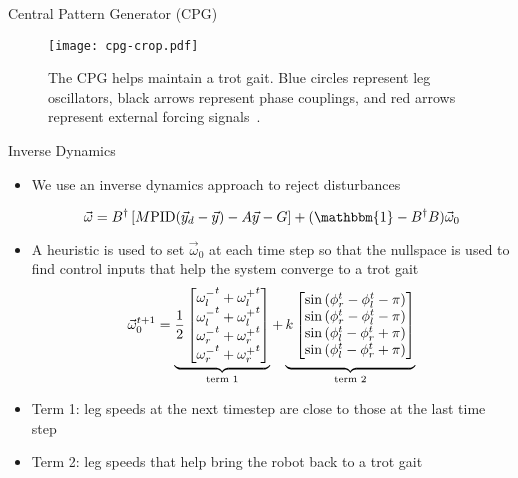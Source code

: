 \textcolor{prime}{\textsf{Central Pattern Generator (CPG)}} \\
\begin{figure}[h]
	\centering
    \texttt{[image: cpg-crop.pdf]}
    \caption{The CPG helps maintain a trot gait. Blue circles represent leg oscillators, black arrows represent phase couplings, and red arrows represent external forcing signals~\cite{crespi2006amphibot}.}
    \label{fig:CPG_Network}
\end{figure}
\vspace{-0.25in}

\vspace{1EX}
\textcolor{prime}{\textsf{Inverse Dynamics}} \\
\begin{itemize}
\item We use an inverse dynamics approach to reject disturbances

    \begin{equation}
        \vec{\omega} = B^{\dagger} \left[M \mathrm{PID}(\vec{y}_d - \vec{y})- A \vec{y} - G \right] + (\mathbbm{1} - B^{\dagger} B) \vec{\omega}_0 \label{eq:control}
    \end{equation}

\item A heuristic is used to set $\vec{\omega}_0$ at each time step so that the nullspace is used to find control inputs that help the system converge to a trot gait
\begin{equation}
    \vec{\omega}_0^{t+1} = \underbrace{\frac{1}{2}\begin{bmatrix}
        {\omega_l^-}^t + {\omega_l^+}^t \\
        {\omega_l^-}^t + {\omega_l^+}^t \\
        {\omega_r^-}^t + {\omega_r^+}^t \\
        {\omega_r^-}^t + {\omega_r^+}^t \\
    \end{bmatrix}}_{\text{term 1}} + 
    \underbrace{\vphantom{\frac{1}{2}\begin{bmatrix}
        {\omega_l^-}^t + {\omega_l^+}^t \\
        {\omega_l^-}^t + {\omega_l^+}^t \\
        {\omega_r^-}^t + {\omega_r^+}^t \\
        {\omega_r^-}^t + {\omega_r^+}^t \\
    \end{bmatrix}}
    k \begin{bmatrix}
        \sin \left( \phi_r^t - \phi_l^t - \pi \right) \\
        \sin \left( \phi_r^t - \phi_l^t - \pi \right) \\
        \sin \left( \phi_l^t - \phi_r^t + \pi \right) \\
        \sin \left( \phi_l^t - \phi_r^t + \pi \right) \\
    \end{bmatrix}}_{\text{term 2}}
    \label{eq:hu}
\end{equation}

\item Term 1: leg speeds at the next timestep are close to those at the last time step
\item Term 2: leg speeds that help bring the robot back to a trot gait
\end{itemize}
